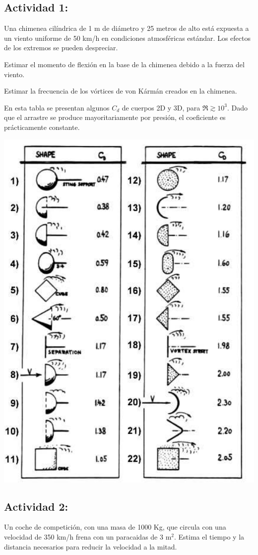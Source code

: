 	

	
	\subsection*{Actividad 1:}
		Una chimenea cilíndrica de 1 m de diámetro y 25 metros de alto está
		expuesta a un viento uniforme de 50 km/h en condiciones atmosféricas
		estándar. Los efectos de los extremos se pueden despreciar. 
		
		Estimar el momento de flexión en la base de la chimenea debido a la
		fuerza del viento.
		
		Estimar la frecuencia de los vórtices de von Kármán creados en la
		chimenea.


	

		En esta tabla se presentan algunos $C_{d}$ de cuerpos 2D y 3D, para
		$\Re\gtrsim10^{3}$. Dado que el arrastre se produce mayoritariamente
		por presión, el coeficiente es prácticamente constante.%

\begin{center}
	\includegraphics[width=0.6\linewidth]{TeX_files/chapter09-Externo/drag-shapes}
\end{center}


	
	\subsection*{Actividad 2:}
		Un coche de competición, con una masa de 1000 Kg, que circula con
		una velocidad de 350 km/h frena con un paracaidas de 3 m$^{2}$. Estima
		el tiempo y la distancia necesarios para reducir la velocidad a la
		mitad.
		
